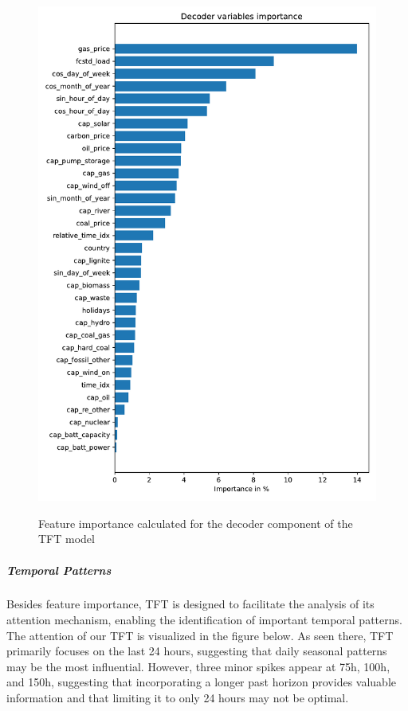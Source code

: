 \documentclass[a4paper]{article}
\begin{document}
    \begin{figure}
\centering
{\includegraphics[keepaspectratio]{src/decoder.pdf}}
\caption{Feature importance calculated for the decoder component of the
TFT model}
\end{figure}

    \subparagraph{Temporal Patterns}\label{temporal-patterns}

Besides feature importance, TFT is designed to facilitate the analysis
of its attention mechanism, enabling the identification of important
temporal patterns. The attention of our TFT is visualized in the figure
below. As seen there, TFT primarily focuses on the last 24 hours,
suggesting that daily seasonal patterns may be the most influential.
However, three minor spikes appear at 75h, 100h, and 150h, suggesting
that incorporating a longer past horizon provides valuable information
and that limiting it to only 24 hours may not be optimal.
\end{document}
